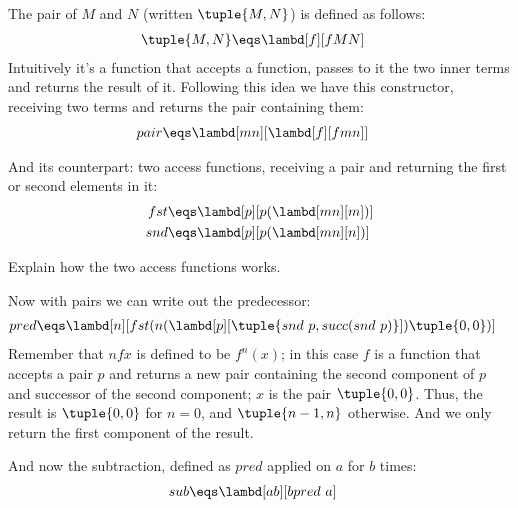 \documentclass[../../../include/open-logic-section]{subfiles}
\begin{document}

The pair of $M$ and $N$ (written $\tuple{M,N}$) is defined as follows:
\begin{align*}
  \tuple{M,N} &\eqs \lambd[f][fMN]
\end{align*}
Intuitively it's a function that accepts a function, passes to it the
two inner terms and returns the result of it. Following this idea we
have this constructor, receiving two terms and returns the pair
containing them:
\begin{align*}
  {pair} &\eqs \lambd[mn][\lambd[f][fmn]]
\end{align*}

And its counterpart: two access functions, receiving a pair and
returning the first or second elements in it:
\begin{align*}
  {fst} &\eqs \lambd[p][p(\lambd[mn][m])]\\
  {snd} &\eqs \lambd[p][p(\lambd[mn][n])]
\end{align*}

\begin{prob}
  Explain how the two access functions works.
\end{prob}

Now with pairs we can write out the predecessor:
\begin{align*}
  {pred} &\eqs \lambd[n][{fst}(n (\lambd[p][\tuple{{snd}~ {p}, {succ}({snd} ~{p})}]) \tuple{0, 0})]
\end{align*}
Remember that $n f x$ is defined to be $f^{n}(x)$; in this
case $f$ is a function that accepts a pair $p$ and returns a new
pair containing the second component of $p$ and successor of the
second component; $x$ is the pair $\tuple{0,0}$. Thus, the
result is $\tuple{0,0}$ for $n=0$, and $\tuple{{n-1}, n}$
otherwise. And we only return the first component of the result.

And now the subtraction, defined as $pred$ applied on $a$ for $b$ times:
\begin{align*}
  {sub} &\eqs \lambd[ab][b {pred} ~ a]
\end{align*}
\end{document}

